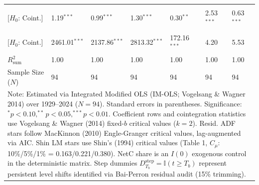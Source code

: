\begin{table}[H]
\begin{tabular}{p{3.8cm}p{2.1cm}p{2.1cm}p{2.1cm}p{2.1cm}p{2.1cm}p{2.1cm}}
\makecell[l]{Shin LM ($C_{\text{Shin}}$) \\ {\scriptsize [$H_0$: Coint.]}} & 1.19$^{***}$ & 0.99$^{***}$ & 1.30$^{***}$ & 0.30$^{**}$ & 2.53$^{***}$ & 0.63$^{***}$  \\
\makecell[l]{VW Type 2 ($S_{\text{Type 2}}$) \\ {\scriptsize [$H_0$: Coint.]}} & 2461.01$^{***}$ & 2137.86$^{***}$ & 2813.32$^{***}$ & 172.16$^{***}$ & 4.20 & 5.53  \\
\midrule
$R^2_{\text{sum}}$ & 1.00 & 1.00 & 1.00 & 1.00 & 1.00 & 1.00  \\
Sample Size ($N$) & 94 & 94 & 94 & 94 & 94 & 94  \\
\bottomrule
\multicolumn{7}{p{16.5cm}}{\footnotesize Note: Estimated via Integrated Modified OLS (IM-OLS; Vogelsang \& Wagner 2014) over 1929--2024 ($N=94$). Standard errors in parentheses. Significance: $^*p<0.10, ^{**}p<0.05, ^{***}p<0.01$. Coefficient rows and cointegration statistics use Vogelsang \& Wagner (2014) fixed-$b$ critical values ($k=2$). Resid. ADF stars follow MacKinnon (2010) Engle-Granger critical values, lag-augmented via AIC. Shin LM stars use Shin's (1994) critical values (Table 1, $C_\mu$: 10\%/5\%/1\% = 0.163/0.221/0.380). NetC share is an $I(0)$ exogenous control in the deterministic matrix. Step dummies $D^{\text{step}}_{T_b} = \mathbb{I}(t \ge T_b)$ represent persistent level shifts identified via Bai-Perron residual audit (15\% trimming).}
\end{tabular}
\end{table}
